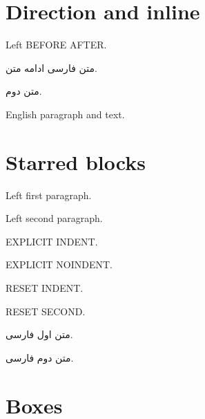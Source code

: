 \documentclass{article}
\begin{document}
\section*{Direction and inline}
Left BEFORE  AFTER.\par
\begin{RTL}متن فارسی  ادامه متن.\par متن دوم.\end{RTL}
\begin{LTR}English paragraph  and text.\end{LTR}
\newpage
\section*{Starred blocks}
\begin{LTR*}
Left first paragraph.\par Left second paragraph.\par\indent EXPLICIT INDENT.\par\noindent EXPLICIT NOINDENT.\par\setlength{\parindent}{24pt} RESET INDENT.\par RESET SECOND.\end{LTR*}
\begin{RTL*}
متن اول فارسی.\par متن دوم فارسی.\end{RTL*}
\newpage
\section*{Boxes}
 
\newpage
\end{document}
